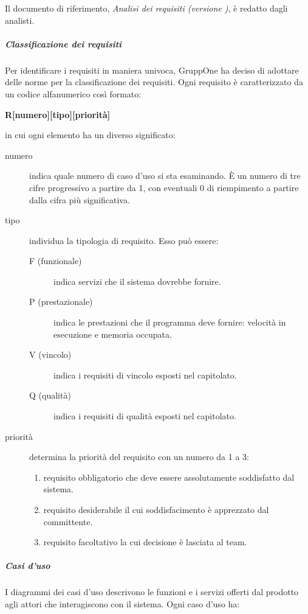 \documentclass[../../norme-di-progetto.tex]{subfiles}
\begin{document}
Il documento di riferimento, \textit{Analisi dei requisiti (versione \versione)}, è redatto dagli analisti.

\subparagraph{Classificazione dei requisiti}%
\label{subp:classificazione_dei_requisiti}

Per identificare i requisiti in maniera univoca, GruppOne ha deciso di adottare delle norme per la classificazione dei requisiti.
Ogni requisito è caratterizzato da un codice alfanumerico così formato:
\begin{center}
  \textbf{R[numero][tipo][priorità]}
\end{center}
in cui ogni elemento ha un diverso significato:
\begin{description}
  \item [numero] indica quale numero di caso d’uso si sta esaminando. È un numero di tre cifre progressivo a partire da 1, con eventuali 0 di riempimento a partire dalla cifra più significativa.
  \item [tipo] individua la tipologia di requisito. Esso può essere:
        \begin{description}
          \item [F (funzionale)] indica servizi che il sistema dovrebbe fornire.
          \item [P (prestazionale)] indica le prestazioni che il programma deve fornire: velocità in esecuzione e memoria occupata.
          \item [V (vincolo)] indica i requisiti di vincolo esposti nel capitolato.
          \item [Q (qualità)] indica i requisiti di qualità esposti nel capitolato.
        \end{description}
  \item [priorità] determina la priorità del requisito con un numero da 1 a 3:
        \begin{enumerate}
          \item requisito obbligatorio che deve essere assolutamente soddisfatto dal sistema.
          \item requisito desiderabile il cui soddisfacimento è apprezzato dal committente.
          \item requisito facoltativo la cui decisione è lasciata al team.
        \end{enumerate}
\end{description}

\subparagraph{Casi d'uso}%
\label{subp:casi_d'uso}
I diagrammi dei casi d'uso descrivono le funzioni e i servizi offerti dal prodotto agli attori che interagiscono con il sistema. Ogni caso d'uso ha:
\end{document}
